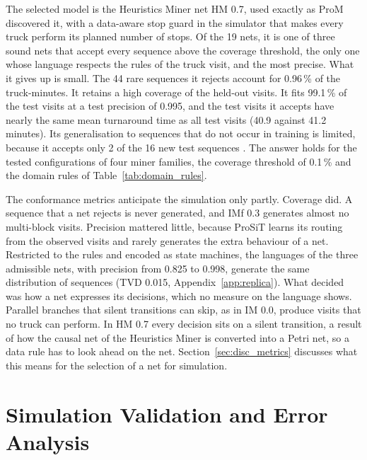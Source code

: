 The selected model is the Heuristics
Miner net HM 0.7, used exactly as ProM discovered it, with a data-aware stop guard
in the simulator that makes every truck perform its planned number of stops. Of
the 19 nets, it is one of three sound nets that accept every sequence above the
coverage threshold, the only one whose language respects the rules of the truck
visit, and the most precise. What it gives up is small. The 44 rare
sequences it rejects account for 0.96\,\% of the truck-minutes. It retains a high coverage
of the held-out visits. It fits 99.1\,\% of the test visits at a test precision of
0.995, and the test visits it accepts have nearly the same mean turnaround time as
all test visits (40.9 against 41.2 minutes). Its generalisation to sequences that do
not occur in training is limited, because it accepts only 2 of the 16 new test
sequences \cite{Aalst2016}. The answer holds for the tested configurations of four
miner families, the coverage threshold of 0.1\,\% and the domain rules of
Table~\ref{tab:domain_rules}.

The conformance metrics
anticipate the simulation only partly. Coverage did. A sequence that a net rejects
is never generated, and IMf 0.3 generates almost no multi-block visits. Precision
mattered little, because ProSiT learns its routing from the observed visits and
rarely generates the extra behaviour of a net. Restricted to the rules and encoded
as state machines, the languages of the three admissible nets, with precision from
0.825 to 0.998, generate the same distribution of sequences (TVD 0.015,
Appendix~\ref{app:replica}). What decided was how a net expresses its decisions,
which no measure on the language shows. Parallel branches that silent transitions
can skip, as in IM 0.0, produce visits that no truck can perform. In HM 0.7 every
decision sits on a silent transition, a result of how the causal net of the
Heuristics Miner is converted into a Petri net, so a data rule has to look ahead on
the net. Section~\ref{sec:disc_metrics} discusses what this means for the selection
of a net for simulation.

\section{Simulation Validation and Error Analysis}
\label{sec:res_mechanisms}

